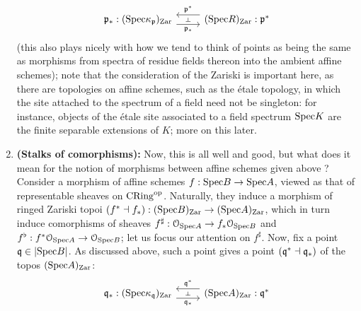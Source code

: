\begin{remark}
\begin{enumerate}
                                $$
                                    \begin{tikzcd}
                                    	{\p_*: (\Spec \kappa_{\p})_{\Zar}} & {(\Spec R)_{\Zar}: \p^*}
                                    	\arrow[""{name=0, anchor=center, inner sep=0}, "\p_*"', shift right=2, from=1-1, to=1-2]
                                    	\arrow[""{name=1, anchor=center, inner sep=0}, "\p^*"', shift right=2, from=1-2, to=1-1]
                                    	\arrow["\dashv"{anchor=center, rotate=-90}, draw=none, from=1, to=0]
                                    \end{tikzcd}
                                $$
                            (this also plays nicely with how we tend to think of points as being the same as morphisms from spectra of residue fields thereon into the ambient affine schemes); note that the consideration of the Zariski is important here, as there are topologies on affine schemes, such as the \'etale topology, in which the site attached to the spectrum of a field need not be singleton: for instance, objects of the \'etale site associated to a field spectrum $\Spec K$ are the finite separable extensions of $K$; more on this later.
                            \item \textbf{(Stalks of comorphisms):} Now, this is all well and good, but what does it mean for the notion of morphisms between affine schemes given above ? Consider a morphism of affine schemes $f: \Spec B \to \Spec A$, viewed as that of representable sheaves on $\Cring^{\op}$. Naturally, they induce a morphism of ringed Zariski topoi $(f^* \ladjoint f_*): (\Spec B)_{\Zar} \to (\Spec A)_{\Zar}$, which in turn induce comorphisms of sheaves $f^{\sharp}: \calO_{\Spec A} \to f_*\calO_{\Spec B}$ and $f^{\flat}: f^*\calO_{\Spec A} \to \calO_{\Spec B}$; let us focus our attention on $f^{\sharp}$. Now, fix a point $\q \in |\Spec B|$. As discussed above, such a point gives a point $(\q^* \ladjoint \q_*)$ of the topos $(\Spec A)_{\Zar}$:
                                $$
                                    \begin{tikzcd}
                                    	{\q_*: (\Spec \kappa_{\q})_{\Zar}} & {(\Spec A)_{\Zar}: \q^*}
                                    	\arrow[""{name=0, anchor=center, inner sep=0}, "\q_*"', shift right=2, from=1-1, to=1-2]
                                    	\arrow[""{name=1, anchor=center, inner sep=0}, "\q^*"', shift right=2, from=1-2, to=1-1]
                                    	\arrow["\dashv"{anchor=center, rotate=-90}, draw=none, from=1, to=0]

\end{tikzcd}$$
\end{enumerate}
\end{remark}
